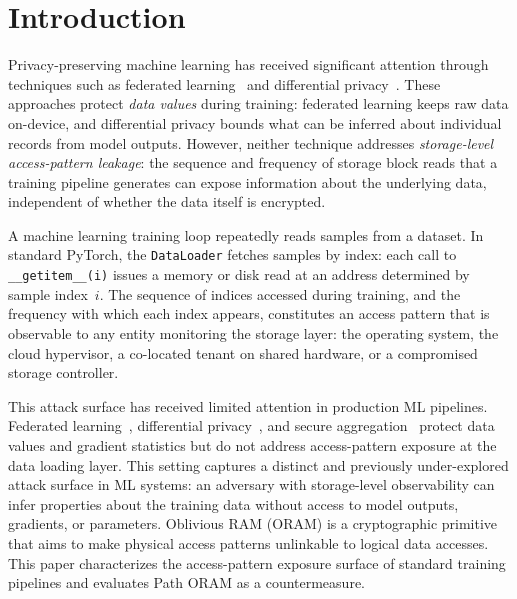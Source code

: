 \documentclass{llncs}
\begin{document}

\section{Introduction}

Privacy-preserving machine learning has received significant attention through techniques such as federated learning~\cite{mcmahan2017} and differential privacy~\cite{dwork2006}.
These approaches protect \emph{data values} during training: federated learning keeps raw data on-device, and differential privacy bounds what can be inferred about individual records from model outputs.
However, neither technique addresses \emph{storage-level access-pattern leakage}: the sequence and frequency of storage block reads that a training pipeline generates can expose information about the underlying data, independent of whether the data itself is encrypted.

A machine learning training loop repeatedly reads samples from a dataset.
In standard PyTorch, the \texttt{DataLoader} fetches samples by index: each call to \texttt{\_\_getitem\_\_(i)} issues a memory or disk read at an address determined by sample index~$i$.
The sequence of indices accessed during training, and the frequency with which each index appears, constitutes an access pattern that is observable to any entity monitoring the storage layer: the operating system, the cloud hypervisor, a co-located tenant on shared hardware, or a compromised storage controller.

This attack surface has received limited attention in production ML pipelines.
Federated learning~\cite{mcmahan2017}, differential privacy~\cite{dwork2006}, and secure aggregation~\cite{bonawitz2017} protect data values and gradient statistics but do not address access-pattern exposure at the data loading layer.
This setting captures a distinct and previously under-explored attack surface in ML systems: an adversary with storage-level observability can infer properties about the training data without access to model outputs, gradients, or parameters.
Oblivious RAM (ORAM) is a cryptographic primitive that aims to make physical access patterns unlinkable to logical data accesses.
This paper characterizes the access-pattern exposure surface of standard training pipelines and evaluates Path ORAM as a countermeasure.
\end{document}
